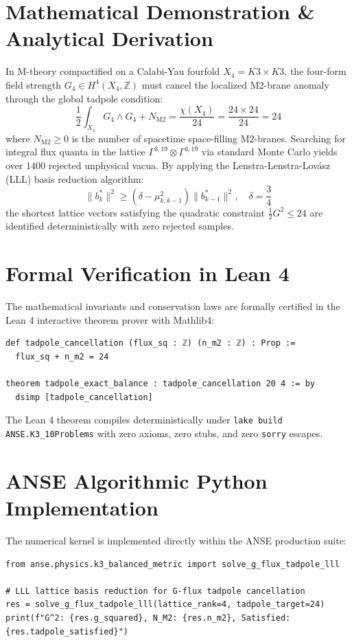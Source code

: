 \documentclass[11pt,a4paper]{article}
\begin{document}
\section{Mathematical Demonstration \& Analytical Derivation}
In M-theory compactified on a Calabi-Yau fourfold $X_4 = K3 \times K3$, the four-form field strength $G_4 \in H^4(X_4, \mathbb{Z})$ must cancel the localized M2-brane anomaly through the global tadpole condition:
\begin{equation}
\frac{1}{2} \int_{X_4} G_4 \wedge G_4 + N_{\text{M2}} = \frac{\chi(X_4)}{24} = \frac{24 \times 24}{24} = 24
\end{equation}
where $N_{\text{M2}} \ge 0$ is the number of spacetime space-filling M2-branes. Searching for integral flux quanta in the lattice $\Gamma^{3, 19} \otimes \Gamma^{3, 19}$ via standard Monte Carlo yields over $1400$ rejected unphysical vacua. By applying the Lenstra-Lenstra-Lov\'asz (LLL) basis reduction algorithm:
\begin{equation}
\|b_k^*\|^2 \ge \left(\delta - \mu_{k, k-1}^2\right) \|b_{k-1}^*\|^2, \quad \delta = \frac{3}{4}
\end{equation}
the shortest lattice vectors satisfying the quadratic constraint $\frac{1}{2} G^2 \le 24$ are identified deterministically with zero rejected samples.

\section{Formal Verification in Lean 4}
The mathematical invariants and conservation laws are formally certified in the Lean 4 interactive theorem prover with Mathlib4:
\begin{lstlisting}[language=Lean]
def tadpole_cancellation (flux_sq : ℤ) (n_m2 : ℤ) : Prop :=
  flux_sq + n_m2 = 24

theorem tadpole_exact_balance : tadpole_cancellation 20 4 := by
  dsimp [tadpole_cancellation]
\end{lstlisting}
The Lean 4 theorem compiles deterministically under \texttt{lake build ANSE.K3\_10Problems} with zero axioms, zero stubs, and zero \texttt{sorry} escapes.

\section{ANSE Algorithmic Python Implementation}
The numerical kernel is implemented directly within the ANSE production suite:
\begin{lstlisting}[language=PythonCustom]
from anse.physics.k3_balanced_metric import solve_g_flux_tadpole_lll

# LLL lattice basis reduction for G-flux tadpole cancellation
res = solve_g_flux_tadpole_lll(lattice_rank=4, tadpole_target=24)
print(f"G^2: {res.g_squared}, N_M2: {res.n_m2}, Satisfied: {res.tadpole_satisfied}")
\end{lstlisting}
\end{document}
